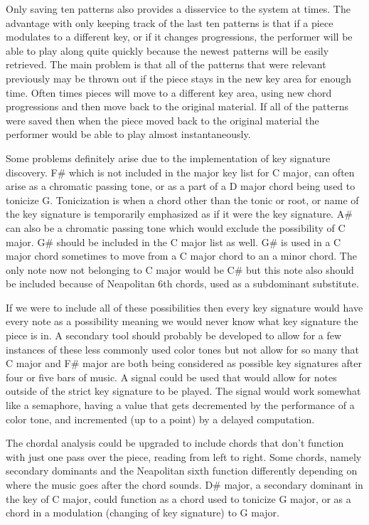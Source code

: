 \documentclass[12pt]{ucthesis}
\begin{document}
Only saving ten patterns also provides a disservice to the system at times. The advantage with only keeping track of the last ten patterns is that if a piece modulates to a different key, or if it changes progressions, the performer will be able to play along quite quickly because the newest patterns will be easily retrieved. The main problem is that all of the patterns that were relevant previously may be thrown out if the piece stays in the new key area for enough time. Often times pieces will move to a different key area, using new chord progressions and then move back to the original material. If all of the patterns were saved then when the piece moved back to the original material the performer would be able to play almost instantaneously. 

Some problems definitely arise due to the implementation of key signature discovery. F\# which is not included in the major key list for C major, can often arise as a chromatic passing tone, or as a part of a D major chord being used to tonicize G. Tonicization is when a chord other than the tonic or root, or name of the key signature is temporarily emphasized as if it were the key signature. A\# can also be a chromatic passing tone which would exclude the possibility of C major. G\# should be included in the C major list as well. G\# is used in a C major chord sometimes to move from a C major chord to an a minor chord. The only note now not belonging to C major would be C\# but this note also should be included because of Neapolitan 6th chords, used as a subdominant substitute.

If we were to include all of these possibilities then every key signature would have every note as a possibility meaning we would never know what key signature the piece is in. A secondary tool should probably be developed to allow for a few instances of these less commonly used color tones but not allow for so many that C major and F\# major are both being considered as possible key signatures after four or five bars of music. A signal could be used that would allow for notes outside of the strict key signature to be played. The signal would work somewhat like a semaphore, having a value that gets decremented by the performance of a color tone, and incremented (up to a point) by a delayed computation. 

The chordal analysis could be upgraded to include chords that don't function with just one pass over the piece, reading from left to right. Some chords, namely secondary dominants and the Neapolitan sixth function differently depending on where the music goes after the chord sounds. D\# major, a secondary dominant in the key of C major, could function as a chord used to tonicize G major, or as a chord in a modulation (changing of key signature) to G major. 
\end{document}

